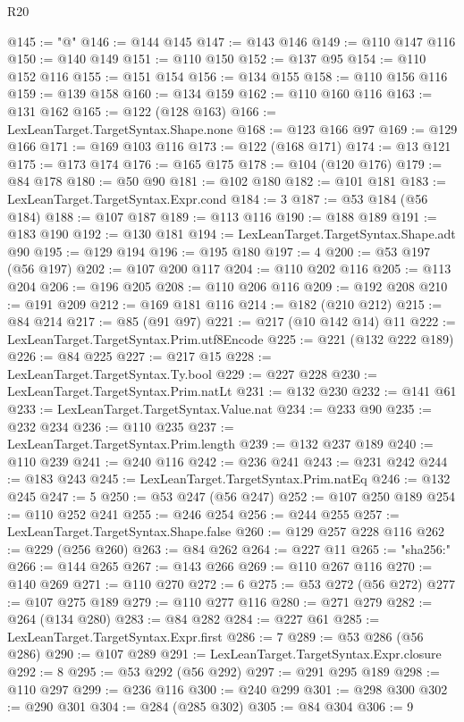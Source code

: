\begin{lexlean}{R20}
\begin{coremodule}
@145 := "@"
@146 := @144 @145
@147 := @143 @146
@149 := @110 @147 @116
@150 := @140 @149
@151 := @110 @150
@152 := @137 @95
@154 := @110 @152 @116
@155 := @151 @154
@156 := @134 @155
@158 := @110 @156 @116
@159 := @139 @158
@160 := @134 @159
@162 := @110 @160 @116
@163 := @131 @162
@165 := @122 (@128 @163)
@166 := LexLeanTarget.TargetSyntax.Shape.none
@168 := @123 @166 @97
@169 := @129 @166
@171 := @169 @103 @116
@173 := @122 (@168 @171)
@174 := @13 @121
@175 := @173 @174
@176 := @165 @175
@178 := @104 (@120 @176)
@179 := @84 @178
@180 := @50 @90
@181 := @102 @180
@182 := @101 @181
@183 := LexLeanTarget.TargetSyntax.Expr.cond
@184 := 3
@187 := @53 @184 (@56 @184)
@188 := @107 @187
@189 := @113 @116
@190 := @188 @189
@191 := @183 @190
@192 := @130 @181
@194 := LexLeanTarget.TargetSyntax.Shape.adt @90
@195 := @129 @194
@196 := @195 @180
@197 := 4
@200 := @53 @197 (@56 @197)
@202 := @107 @200 @117
@204 := @110 @202 @116
@205 := @113 @204
@206 := @196 @205
@208 := @110 @206 @116
@209 := @192 @208
@210 := @191 @209
@212 := @169 @181 @116
@214 := @182 (@210 @212)
@215 := @84 @214
@217 := @85 (@91 @97)
@221 := @217 (@10 @142 @14) @11
@222 := LexLeanTarget.TargetSyntax.Prim.utf8Encode
@225 := @221 (@132 @222 @189)
@226 := @84 @225
@227 := @217 @15
@228 := LexLeanTarget.TargetSyntax.Ty.bool
@229 := @227 @228
@230 := LexLeanTarget.TargetSyntax.Prim.natLt
@231 := @132 @230
@232 := @141 @61
@233 := LexLeanTarget.TargetSyntax.Value.nat
@234 := @233 @90
@235 := @232 @234
@236 := @110 @235
@237 := LexLeanTarget.TargetSyntax.Prim.length
@239 := @132 @237 @189
@240 := @110 @239
@241 := @240 @116
@242 := @236 @241
@243 := @231 @242
@244 := @183 @243
@245 := LexLeanTarget.TargetSyntax.Prim.natEq
@246 := @132 @245
@247 := 5
@250 := @53 @247 (@56 @247)
@252 := @107 @250 @189
@254 := @110 @252 @241
@255 := @246 @254
@256 := @244 @255
@257 := LexLeanTarget.TargetSyntax.Shape.false
@260 := @129 @257 @228 @116
@262 := @229 (@256 @260)
@263 := @84 @262
@264 := @227 @11
@265 := "sha256:"
@266 := @144 @265
@267 := @143 @266
@269 := @110 @267 @116
@270 := @140 @269
@271 := @110 @270
@272 := 6
@275 := @53 @272 (@56 @272)
@277 := @107 @275 @189
@279 := @110 @277 @116
@280 := @271 @279
@282 := @264 (@134 @280)
@283 := @84 @282
@284 := @227 @61
@285 := LexLeanTarget.TargetSyntax.Expr.first
@286 := 7
@289 := @53 @286 (@56 @286)
@290 := @107 @289
@291 := LexLeanTarget.TargetSyntax.Expr.closure
@292 := 8
@295 := @53 @292 (@56 @292)
@297 := @291 @295 @189
@298 := @110 @297
@299 := @236 @116
@300 := @240 @299
@301 := @298 @300
@302 := @290 @301
@304 := @284 (@285 @302)
@305 := @84 @304
@306 := 9

\end{coremodule}
\end{lexlean}
